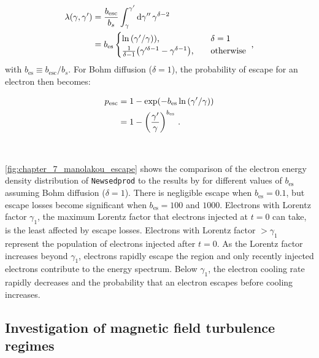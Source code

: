 \begin{equation}
    \begin{aligned}
   	 \lambda\qty(\gamma,\gamma')&=\frac{b_\text{esc}}{b_s}\int_\gamma^{\gamma'}\dd{\gamma''}\gamma^{\delta-2} \\
  	  &=b_\text{es}
  	  \begin{cases}
  		  \ln\qty({\gamma'}/{\gamma}))\text{,}\quad &\delta =1 \\
  		  \frac{1}{\delta-1}\qty(\gamma'^{\delta-1}-\gamma^{\delta -1})\text{,}\quad&\text{otherwise}
    	\end{cases}\text{ ,}
    \end{aligned} \label{eq:chapter_7_lambda_plus_diffusion}
\end{equation}
\noindent with $b_\text{es}\equiv b_\text{esc}/b_s$. For Bohm diffusion ($\delta=1$), the probability of escape for an electron then becomes:

\begin{equation}
    \begin{aligned}
    p_\text{esc}&=1-\exp(-b_\text{es}\ln\qty(\gamma'/\gamma)) \\
    &=1-\qty(\frac{\gamma'}{\gamma})^{b_\text{es}}\text{ .}
    \end{aligned}
\end{equation}
\par~\par
\autoref{fig:chapter_7_manolakou_escape} shows the comparison of the electron energy density distribution of {\tt Newsedprod} to the results  by \cite{2007A&A...474..689M} for different values of $b_\text{es}$ assuming Bohm diffusion ($\delta=1$). There is negligible escape when $b_\text{es}=0.1$, but escape losses become significant when $b_\text{es}=100$ and $1000$. Electrons with Lorentz factor $\gamma_1$, the maximum Lorentz factor that electrons injected at $t=0$ can take, is the least affected by escape losses. Electrons with Lorentz factor $>\gamma_1$ represent the population of electrons injected after $t=0$. As the Lorentz factor increases beyond $\gamma_1$, electrons rapidly escape the region and only recently injected electrons contribute to the energy spectrum. Below $\gamma_1$, the electron cooling rate rapidly decreases and the probability that an electron escapes before cooling increases. 

\subsection{Investigation of magnetic field turbulence regimes}

